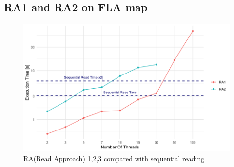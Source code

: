 \documentclass[12pt]{beamer}
\begin{document}
	\subsection{RA1 and RA2 on FLA map}
	\begin{frame}{\secname}
		\framesubtitle{\subsecname}
		\begin{figure}[ht!]
			\centering
			\includegraphics[width=1\linewidth]{read/par_read_all_time.png}
			\caption{RA(Read Approach) 1,2,3 compared with sequential reading}
			\label{parreadalltime}
		\end{figure}
	\end{frame}
\end{document}
